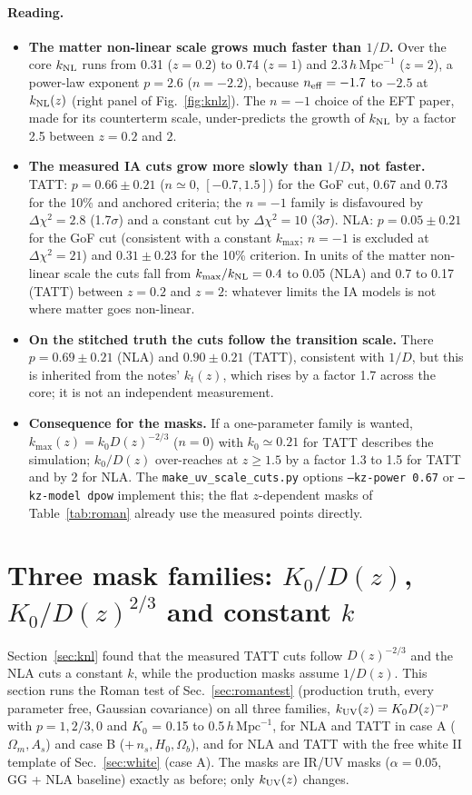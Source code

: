 \documentclass[11pt]{article}
\newcommand{\hmpc}{\,h\,\mathrm{Mpc}^{-1}}
\begin{document}
\paragraph{Reading.}
\begin{itemize}
\item \textbf{The matter non-linear scale grows much faster than $1/D$.} Over the core $k_{\rm NL}$ runs from 0.31 ($z=0.2$) to 0.74 ($z=1$) and 2.3$\hmpc$ ($z=2$), a power-law exponent $p=2.6$ ($n=-2.2$), because $n_{\rm eff}=-1.7$ to $-2.5$ at $k_{\rm NL}(z)$ (right panel of Fig.~\ref{fig:knlz}). The $n=-1$ choice of the EFT paper, made for its counterterm scale, under-predicts the growth of $k_{\rm NL}$ by a factor 2.5 between $z=0.2$ and $2$.
\item \textbf{The measured IA cuts grow more slowly than $1/D$, not faster.} TATT: $p=0.66\pm0.21$ ($n\simeq0$, $[-0.7,1.5]$) for the GoF cut, $0.67$ and $0.73$ for the 10\% and anchored criteria; the $n=-1$ family is disfavoured by $\Delta\chi^2=2.8$ (1.7$\sigma$) and a constant cut by $\Delta\chi^2=10$ (3$\sigma$). NLA: $p=0.05\pm0.21$ for the GoF cut (consistent with a constant $k_{\max}$; $n=-1$ is excluded at $\Delta\chi^2=21$) and $0.31\pm0.23$ for the 10\% criterion. In units of the matter non-linear scale the cuts fall from $k_{\max}/k_{\rm NL}=0.4$ to 0.05 (NLA) and 0.7 to 0.17 (TATT) between $z=0.2$ and $z=2$: whatever limits the IA models is not where matter goes non-linear.
\item \textbf{On the stitched truth the cuts follow the transition scale.} There $p=0.69\pm0.21$ (NLA) and $0.90\pm0.21$ (TATT), consistent with $1/D$, but this is inherited from the notes' $k_t(z)$, which rises by a factor 1.7 across the core; it is not an independent measurement.
\item \textbf{Consequence for the masks.} If a one-parameter family is wanted, $k_{\max}(z)=k_0D(z)^{-2/3}$ ($n=0$) with $k_0\simeq0.21$ for TATT describes the simulation; $k_0/D(z)$ over-reaches at $z\ge1.5$ by a factor 1.3 to 1.5 for TATT and by 2 for NLA. The \texttt{make\_uv\_scale\_cuts.py} options \texttt{--kz-power 0.67} or \texttt{--kz-model dpow} implement this; the flat $z$-dependent masks of Table~\ref{tab:roman} already use the measured points directly.
\end{itemize}

\section{Three mask families: $K_0/D(z)$, $K_0/D(z)^{2/3}$ and constant $k$}\label{sec:scan}
Section~\ref{sec:knl} found that the measured TATT cuts follow $D(z)^{-2/3}$ and the NLA cuts a constant $k$, while the production masks assume $1/D(z)$. This section runs the Roman test of Sec.~\ref{sec:romantest} (production truth, every parameter free, Gaussian covariance) on all three families, $k_{\rm UV}(z) = K_0 D(z)^{-p}$ with $p = 1, 2/3, 0$ and $K_0$ = 0.15 to 0.5$\hmpc$, for NLA and TATT in case A ($\Omega_m, A_s$) and case B ($+\,n_s, H_0, \Omega_b$), and for NLA and TATT with the free white II template of Sec.~\ref{sec:white} (case A). The masks are IR/UV masks ($\alpha = 0.05$, GG + NLA baseline) exactly as before; only $k_{\rm UV}(z)$ changes.
\end{document}
